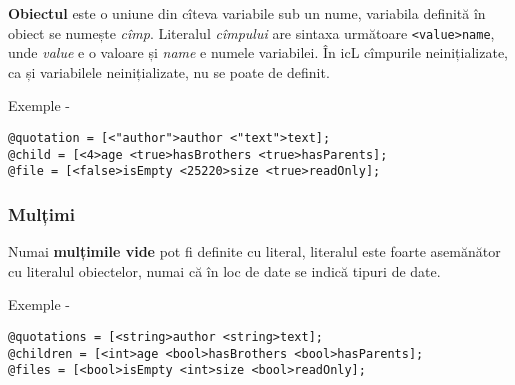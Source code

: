 {\bf Obiectul} este o uniune din cîteva variabile sub un nume, variabila definită în obiect se numește {\it cîmp}. Literalul {\it cîmpului} are sintaxa următoare \lstinline|<value>name|, unde  {\it value} e o valoare și {\it name} e numele variabilei. În icL cîmpurile neinițializate, ca și variabilele neinițializate, nu se poate de definit.

\noindent Exemple -
\begin{lstlisting}[numbers=none]
@quotation = [<"author">author <"text">text];
@child = [<4>age <true>hasBrothers <true>hasParents];
@file = [<false>isEmpty <25220>size <true>readOnly];
\end{lstlisting}

\subsubsection{Mulțimi}

Numai {\bf mulțimile vide} pot fi definite cu literal, literalul este foarte asemănător cu literalul obiectelor, numai că în loc de date se indică tipuri de date.

\noindent Exemple -
\begin{lstlisting}[numbers=none]
@quotations = [<string>author <string>text];
@children = [<int>age <bool>hasBrothers <bool>hasParents];
@files = [<bool>isEmpty <int>size <bool>readOnly];
\end{lstlisting}

